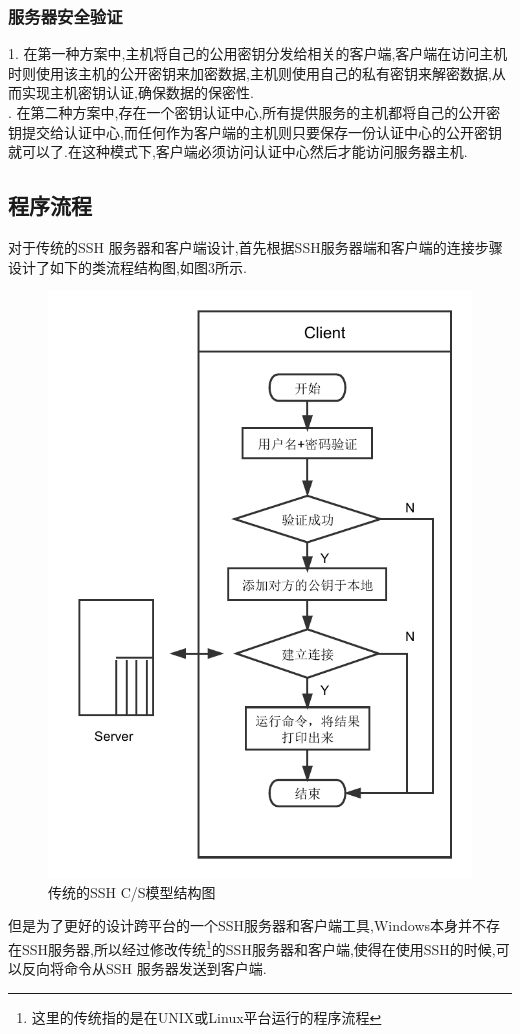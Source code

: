 \documentclass[UTF8,nofonts,a4paper]{ctexart}
\begin{document}
\subsubsection{服务器安全验证}
1. 在第一种方案中,主机将自己的公用密钥分发给相关的客户端,客户端在访问主机时则使用该主机的公开密钥来加密数据,主机则使用自己的私有密钥来解密数据,从而实现主机密钥认证,确保数据的保密性.\\
. 在第二种方案中,存在一个密钥认证中心,所有提供服务的主机都将自己的公开密钥提交给认证中心,而任何作为客户端的主机则只要保存一份认证中心的公开密钥就可以了.在这种模式下,客户端必须访问认证中心然后才能访问服务器主机.

\subsection{程序流程}
对于传统的SSH 服务器和客户端设计,首先根据SSH服务器端和客户端的连接步骤设计了如下的类流程结构图,如图3所示.
\begin{figure}[htbp]
\centering
\includegraphics[scale = 0.6]{flow.pdf}
\caption{传统的SSH C/S模型结构图}
\end{figure}
\newpage
但是为了更好的设计跨平台的一个SSH服务器和客户端工具,Windows本身并不存在SSH服务器,所以经过修改传统\footnote{这里的传统指的是在UNIX或Linux平台运行的程序流程}的SSH服务器和客户端,使得在使用SSH的时候,可以反向将命令从SSH 服务器发送到客户端.
\end{document}
